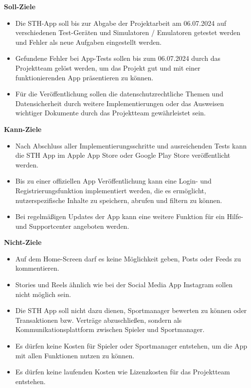 \textbf{Soll-Ziele}
\begin{itemize}
    \item Die STH-App soll bis zur Abgabe der Projektarbeit am 06.07.2024 auf verschiedenen Test-Geräten und Simulatoren / Emulatoren getestet werden und Fehler als neue Aufgaben eingestellt werden.
    \item Gefundene Fehler bei App-Tests sollen bis zum 06.07.2024 durch das Projektteam gelöst werden, um das Projekt gut und mit einer funktionierenden App präsentieren zu können.
    \item Für die Veröffentlichung sollen die datenschutzrechtliche Themen und Datensicherheit durch weitere Implementierungen oder das Ausweisen wichtiger Dokumente durch das Projektteam gewährleistet sein.
\end{itemize}

\textbf{Kann-Ziele}
\begin{itemize}
    \item Nach Abschluss aller Implementierungsschritte und ausreichenden Tests kann die STH App im Apple App Store oder Google Play Store veröffentlicht werden.
    \item Bis zu einer offiziellen App Veröffentlichung kann eine Login- und Registrierungsfunktion implementiert werden, die es ermöglicht, nutzerspezifische Inhalte zu speichern, abrufen und filtern zu können.
    \item Bei regelmäßigen Updates der App kann eine weitere Funktion für ein Hilfe- und Supportcenter angeboten werden.
\end{itemize}

\textbf{Nicht-Ziele}
\begin{itemize}
    \item Auf dem Home-Screen darf es keine Möglichkeit geben, Posts oder Feeds zu kommentieren.
    \item Stories und Reels ähnlich wie bei der Social Media App Instagram sollen nicht möglich sein.
    \item Die STH App soll nicht dazu dienen, Sportmanager bewerten zu können oder Transaktionen bzw. Verträge abzuschließen, sondern als Kommunikationsplattform zwischen Spieler und Sportmanager.
    \item Es dürfen keine Kosten für Spieler oder Sportmanager entstehen, um die App mit allen Funktionen nutzen zu können.
    \item Es dürfen keine laufenden Kosten wie Lizenzkosten für das Projektteam entstehen.
\end{itemize}

